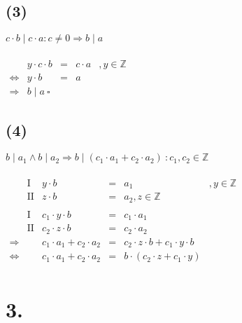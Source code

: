 \documentclass[a4paper]{scrartcl}
\newcommand{\qed}{\ \square}
\begin{document}
	\subsection{(3)}
		\(c\cdot b\mid c\cdot a :c\neq 0 \Rightarrow b\mid a\) \\ \\
		\(
		\begin{array}{rrcll}
			&y\cdot c\cdot b &=& c\cdot a &,y\in\mathbb{Z} \\
			\Leftrightarrow &y\cdot b &=& a \\
			\Rightarrow & b\mid a \qed
		\end{array}
		\)

	\subsection{(4)}
	\(b\mid a_1\land b\mid a_2 \Rightarrow b\mid (c_1\cdot a_1+c_2\cdot a_2)\ : c_1,c_2\in\mathbb{Z}\)\\ 
	\\
	\(
	\begin{array}{rrrcll}
		&\text{I}&y\cdot b &=&a_1 &,y\in\mathbb{Z} \\
		&\text{II}& z\cdot b &=&a_2,z\in\mathbb{Z} \\
		\\
		&\text{I}&c_1\cdot y\cdot b &=&c_1\cdot a_1 \\
		&\text{II}&c_2\cdot z\cdot b &=&c_2\cdot a_2 \\
		\Rightarrow && c_1\cdot a_1+c_2\cdot a_2 &=&c_2\cdot z\cdot b+c_1\cdot y\cdot b\\
		\Leftrightarrow &&c_1\cdot a_1+c_2\cdot a_2 &=& b\cdot(c_2\cdot z+c_1\cdot y) \\
	\end{array}
	\)


\section{3.}
\end{document}
